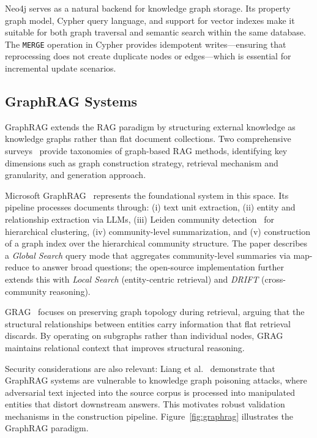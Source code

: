 Neo4j serves as a natural backend for knowledge graph storage. Its property graph model, Cypher query language, and support for vector indexes make it suitable for both graph traversal and semantic search within the same database. The \texttt{MERGE} operation in Cypher provides idempotent writes---ensuring that reprocessing does not create duplicate nodes or edges---which is essential for incremental update scenarios.

\subsection{GraphRAG Systems}
\label{sec:rw:graphrag_systems}

GraphRAG extends the RAG paradigm by structuring external knowledge as knowledge graphs rather than flat document collections. Two comprehensive surveys~\cite{han2025retrievalaugmentedgenerationgraphsgraphrag, peng2024graphretrievalaugmentedgenerationsurvey} provide taxonomies of graph-based RAG methods, identifying key dimensions such as graph construction strategy, retrieval mechanism and granularity, and generation approach.

Microsoft GraphRAG~\cite{edge2025localglobalgraphrag} represents the foundational system in this space. Its pipeline processes documents through: (i) text unit extraction, (ii) entity and relationship extraction via LLMs, (iii) Leiden community detection~\cite{traag2019from} for hierarchical clustering, (iv) community-level summarization, and (v) construction of a graph index over the hierarchical community structure. The paper describes a \emph{Global Search} query mode that aggregates community-level summaries via map-reduce to answer broad questions; the open-source implementation further extends this with \emph{Local Search} (entity-centric retrieval) and \emph{DRIFT} (cross-community reasoning).

GRAG~\cite{hu2025graggraphretrievalaugmentedgeneration} focuses on preserving graph topology during retrieval, arguing that the structural relationships between entities carry information that flat retrieval discards. By operating on subgraphs rather than individual nodes, GRAG maintains relational context that improves structural reasoning.

Security considerations are also relevant: Liang et al.~\cite{liang2025graphrag} demonstrate that GraphRAG systems are vulnerable to knowledge graph poisoning attacks, where adversarial text injected into the source corpus is processed into manipulated entities that distort downstream answers. This motivates robust validation mechanisms in the construction pipeline. Figure~\ref{fig:graphrag} illustrates the GraphRAG paradigm.

